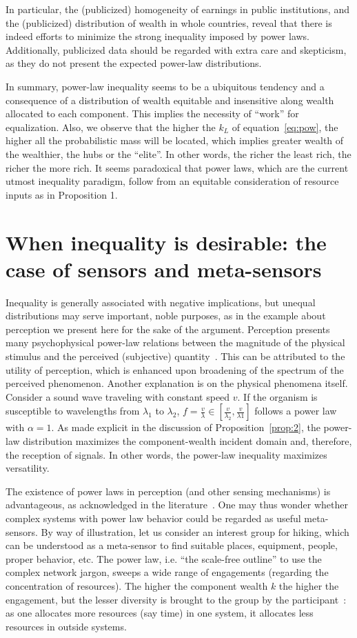 \documentclass[a4paper, 11pt]{article} %
\begin{document}
In particular, the (publicized)
homogeneity of earnings in public institutions,
and the (publicized) distribution of wealth in whole countries,
reveal that there is indeed efforts to minimize
the strong inequality imposed by power laws.
Additionally, publicized data should be regarded with
extra care and skepticism, as they do not present the
expected power-law distributions.

In summary, power-law inequality seems to be a ubiquitous tendency
and a consequence of a distribution of wealth equitable and insensitive along wealth allocated to each component.
This implies the necessity of ``work'' for equalization.
Also, we observe that the higher the $k_L$ of equation~\ref{eq:pow}, the higher all the probabilistic mass will be located, which
implies greater wealth of the wealthier, the hubs or the ``elite''.
In other words, the richer the least rich,
the richer the more rich. It seems paradoxical that power laws, which are the current utmost inequality paradigm, follow from an equitable consideration of resource inputs as in Proposition 1.


\section{When inequality is desirable: the case of sensors and meta-sensors}\label{sec:meta}

Inequality is generally associated with negative implications, but unequal distributions may serve important, noble purposes, as in the example about perception we present here for the sake of the argument.  
Perception presents many psychophysical power-law relations between the magnitude of the physical stimulus and the perceived (subjective) quantity~\cite{pbook}. This can be attributed to the utility of perception, which is enhanced upon broadening of the spectrum of the perceived phenomenon. Another explanation is on the physical phenomena itself. Consider a sound wave traveling with constant speed $v$.
If the organism is susceptible to wavelengths from $\lambda_1$
to $\lambda_2$, $f=\frac{v}{\lambda} \in [\frac{v}{\lambda_2},\frac{v}{\lambda1}]$ follows a power law with $\alpha=1$. As made explicit in the discussion of Proposition~\ref{prop:2}, the power-law distribution
maximizes the component-wealth incident domain and,
therefore, the reception of signals.
In other words, the power-law inequality
maximizes versatility.

The existence of power laws in perception (and other sensing mechanisms) is advantageous, as acknowledged in the literature~\cite{psycho}. One may thus wonder whether complex systems with power law behavior could be regarded as useful meta-sensors. By way of illustration, let us consider an interest group for hiking, which can be understood as a meta-sensor to find suitable 
places, equipment, people, proper behavior, etc.
The power law, i.e. ``the scale-free outline'' to use
the complex network jargon, sweeps a wide range of engagements (regarding the concentration of resources).
The higher the component wealth $k$ the higher the engagement,
but the lesser diversity is brought to the group
by the participant~\cite{tStable}: as one allocates more resources (say time) in one system, it allocates less resources in outside systems.
\end{document}
